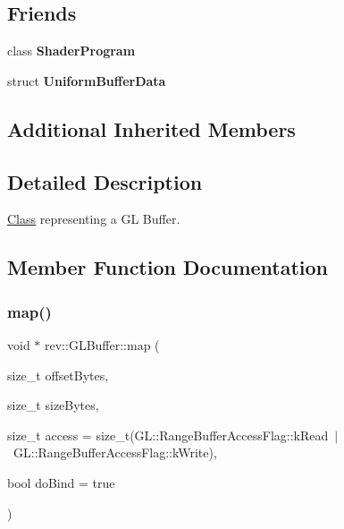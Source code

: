 \subsection*{Friends}
\begin{DoxyCompactItemize}
\item 
\mbox{\label{classrev_1_1_g_l_buffer_aef20119bde6aff11ffd23f3ea2131b86}} 
class {\bfseries Shader\+Program}
\item 
\mbox{\label{classrev_1_1_g_l_buffer_ad822365c23ec45fc98317c00b733bb02}} 
struct {\bfseries Uniform\+Buffer\+Data}
\end{DoxyCompactItemize}
\subsection*{Additional Inherited Members}


\subsection{Detailed Description}
\mbox{\hyperlink{struct_class}{Class}} representing a GL Buffer. 

\subsection{Member Function Documentation}
\mbox{\label{classrev_1_1_g_l_buffer_a36308de451b296fcb41db56e407a209d}} 
\subsubsection{\texorpdfstring{map()}{map()}}
{\footnotesize\ttfamily void $\ast$ rev\+::\+G\+L\+Buffer\+::map (\begin{DoxyParamCaption}\item[{size\+\_\+t}]{offset\+Bytes,  }\item[{size\+\_\+t}]{size\+Bytes,  }\item[{size\+\_\+t}]{access = {\ttfamily size\+\_\+t(GL\+:\+:RangeBufferAccessFlag\+:\+:kRead~$\vert$~GL\+:\+:RangeBufferAccessFlag\+:\+:kWrite)},  }\item[{bool}]{do\+Bind = {\ttfamily true} }\end{DoxyParamCaption})}

